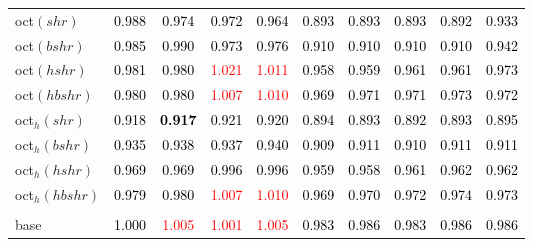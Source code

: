 \begin{tabular}[t]{>{\centering\arraybackslash}m{2.5cm}ccccccccc}
oct$(shr)$ & \textcolor{black}{0.988} & \textcolor{black}{0.974} & \textcolor{black}{0.972} & \textcolor{black}{0.964} & \textcolor{black}{0.893} & \textcolor{black}{0.893} & \textcolor{black}{0.893} & \textcolor{black}{0.892} & \textcolor{black}{0.933}\\
oct$(bshr)$ & \textcolor{black}{0.985} & \textcolor{black}{0.990} & \textcolor{black}{0.973} & \textcolor{black}{0.976} & \textcolor{black}{0.910} & \textcolor{black}{0.910} & \textcolor{black}{0.910} & \textcolor{black}{0.910} & \textcolor{black}{0.942}\\
oct$(hshr)$ & \textcolor{black}{0.981} & \textcolor{black}{0.980} & \textcolor{red}{1.021} & \textcolor{red}{1.011} & \textcolor{black}{0.958} & \textcolor{black}{0.959} & \textcolor{black}{0.961} & \textcolor{black}{0.961} & \textcolor{black}{0.973}\\
oct$(hbshr)$ & \textcolor{black}{0.980} & \textcolor{black}{0.980} & \textcolor{red}{1.007} & \textcolor{red}{1.010} & \textcolor{black}{0.969} & \textcolor{black}{0.971} & \textcolor{black}{0.971} & \textcolor{black}{0.973} & \textcolor{black}{0.972}\\
oct$_h(shr)$ & \textcolor{black}{0.918} & \textcolor{black}{\textbf{0.917}} & \textcolor{black}{0.921} & \textcolor{black}{0.920} & \textcolor{black}{0.894} & \textcolor{black}{0.893} & \textcolor{black}{0.892} & \textcolor{black}{0.893} & \textcolor{black}{0.895}\\
oct$_h(bshr)$ & \textcolor{black}{0.935} & \textcolor{black}{0.938} & \textcolor{black}{0.937} & \textcolor{black}{0.940} & \textcolor{black}{0.909} & \textcolor{black}{0.911} & \textcolor{black}{0.910} & \textcolor{black}{0.911} & \textcolor{black}{0.911}\\
oct$_h(hshr)$ & \textcolor{black}{0.969} & \textcolor{black}{0.969} & \textcolor{black}{0.996} & \textcolor{black}{0.996} & \textcolor{black}{0.959} & \textcolor{black}{0.958} & \textcolor{black}{0.961} & \textcolor{black}{0.962} & \textcolor{black}{0.962}\\
oct$_h(hbshr)$ & \textcolor{black}{0.979} & \textcolor{black}{0.980} & \textcolor{red}{1.007} & \textcolor{red}{1.010} & \textcolor{black}{0.969} & \textcolor{black}{0.970} & \textcolor{black}{0.972} & \textcolor{black}{0.974} & \textcolor{black}{0.973}\\
\addlinespace[0.3em]
\multicolumn{10}{c}{\textbf{$k = 1$}}\\
base & \textcolor{black}{1.000} & \textcolor{red}{1.005} & \textcolor{red}{1.001} & \textcolor{red}{1.005} & \textcolor{black}{0.983} & \textcolor{black}{0.986} & \textcolor{black}{0.983} & \textcolor{black}{0.986} & \textcolor{black}{0.986}\\

\end{tabular}
